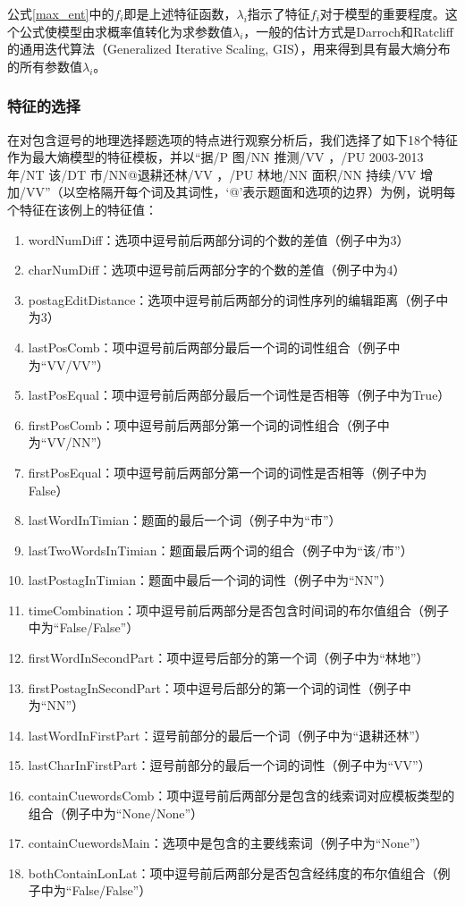 \documentclass[master, winfont]{njuthesis}
\begin{document}
公式\ref{max_ent}中的$f_i$即是上述特征函数，${\lambda}_{i}$指示了特征$f_i$对于模型的重要程度。这个公式使模型由求概率值转化为求参数值${\lambda}_{i}$，一般的估计方式是Darroch和Ratcliff的通用迭代算法（Generalized Iterative Scaling, GIS）\cite{Darroch1972Generalized}，用来得到具有最大熵分布的所有参数值${\lambda}_{i}$。

\subsubsection{特征的选择}
\label{features}
在对包含逗号的地理选择题选项的特点进行观察分析后，我们选择了如下18个特征作为最大熵模型的特征模板，并以“据/P 图/NN 推测/VV ，/PU 2003-2013年/NT 该/DT 市/NN@退耕还林/VV ，/PU 林地/NN 面积/NN 持续/VV 增加/VV”（以空格隔开每个词及其词性，‘@’表示题面和选项的边界）为例，说明每个特征在该例上的特征值：
\begin{enumerate}
  \item wordNumDiff：选项中逗号前后两部分词的个数的差值（例子中为3）
  \item charNumDiff：选项中逗号前后两部分字的个数的差值（例子中为4）
  \item postagEditDistance：选项中逗号前后两部分的词性序列的编辑距离（例子中为3）
  \item lastPosComb：项中逗号前后两部分最后一个词的词性组合（例子中为“VV/VV”）
  \item lastPosEqual：项中逗号前后两部分最后一个词性是否相等（例子中为True）
  \item firstPosComb：项中逗号前后两部分第一个词的词性组合（例子中为“VV/NN”）
  \item firstPosEqual：项中逗号前后两部分第一个词的词性是否相等（例子中为False）
  \item lastWordInTimian：题面的最后一个词（例子中为“市”）
  \item lastTwoWordsInTimian：题面最后两个词的组合（例子中为“该/市”）
  \item lastPostagInTimian：题面中最后一个词的词性（例子中为“NN”）
  \item timeCombination：项中逗号前后两部分是否包含时间词的布尔值组合（例子中为“False/False”）
  \item firstWordInSecondPart：项中逗号后部分的第一个词（例子中为“林地”）
  \item firstPostagInSecondPart：项中逗号后部分的第一个词的词性（例子中为“NN”）
  \item lastWordInFirstPart：逗号前部分的最后一个词（例子中为“退耕还林”）
  \item lastCharInFirstPart：逗号前部分的最后一个词的词性（例子中为“VV”）
  \item containCuewordsComb：项中逗号前后两部分是包含的线索词对应模板类型的组合（例子中为“None/None”）
  \item containCuewordsMain：选项中是包含的主要线索词（例子中为“None”）
  \item bothContainLonLat：项中逗号前后两部分是否包含经纬度的布尔值组合（例子中为“False/False”）
\end{enumerate}
\end{document}
